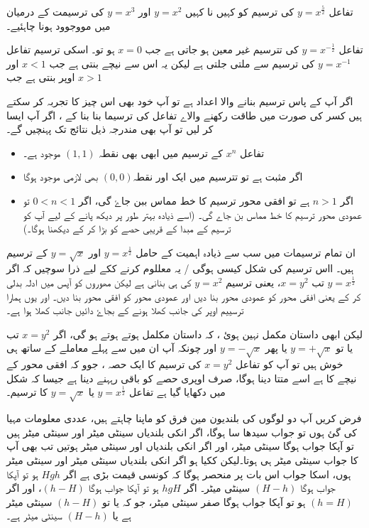 تفاعل \(y=x^{\frac{5}{2}}\) کی ترسیم کو کہیں نا کہیں  \(y=x^{2}   \) اور  \(  y=x^{3}\) کی ترسیمت کے درمیان میں مووجوود ہونا چاہئیے۔

تفاعل  \( y=x^{-\frac{1}{2}}   \) کی تترسیم غیر معین ہو جاتی ہے جب \(   x=0\) ہو تو۔ اسکی ترسیم تفاعل \(y=x^{-1}  \) کی ترسیم سے ملتی جلتی ہے لیکن یہ اس سے نیچے بنتی ہے جب  \( x<1  \) اور اوپر بنتی ہے جب \(     x>1\)

اگر آپ کے پاس ترسیم بنانے والا اعداد ہے تو آپ خود بھی اس چیز کا تجربہ کر سکتے ہیں کسر کی صورت میں طاقت رکھنے والاے تفاعل کی ترسیما بنا بنا کے ، اگر آپ ایسا کر لیں تو آپ بھی مندرجہ ذیل نتائج تک پہنچیں گے۔
\begin{itemize}
\item  
تفاعل  \( x^{n}  \) کے ترسیم میں ابھی بھی نقطہ \(   (1,1)\) موجود ہے۔ 
\item  
اگر  مثبت ہے تو تترسیم میں ایک اور نقطہ\((0,0)\) بھی لازمی موجود ہوگا 
\item 
 اگر \(n>1   \) ہے تو افقی محور ترسیم کا خط مماس ببن جاۓ گی، اگر \(   0<n<1\) تو  عمودی محور ترسیم کا خط مماس بن جاے گی۔ (اسے ذیادہ بہتر طور پر دیکھ پانے کے لیے آپ کو ترسیم کے مبدا کے قریبی حصے کو بڑا کر کے دیکھنا ہوگا۔)
\end{itemize}
  
ان تمام ترسیمات میں سب سے ذیادہ اہمیت کے حامل \(y=x^{\frac{1}{2}}  \)  اور \(   y=\sqrt{x}\) کے ترسیم ہیں۔ ااس ترسیم کی شکل کیسی ہوگی / یہ معللوم کرنے ککے لیے ذرا سوچیں کہ اگر \( y=x^{\frac{1}{2}}  \) تب \( x=y^{2}  \)، یعنی ترسیم \(   y=x^{2}\) کی ہی بنانی ہے لیکن مھوروں کو آپس میں ادلہ بدلی کر کے یعنی افقی محور کو عمودی محور بنا دیں اور عمودی محور کو افقی محور بنا دیں۔ اور یوں ہمارا ترسییم اوپر کی جانب کھلا ہونے کے بجاۓ دائیں جانب کھلا ہوا ہے۔ 

لیکن ابھی داستان مکمل نہین ہوئ ، کہ داستان مکلمل ہوتے ہوتے ہو گی، اگر \( x=y^{2}  \) تب یا تو \(  y=+\sqrt{x}  \) یا پھر \(  y=-\sqrt{x}  \) اور چونکہ آپ ان میں سے پہلے معاملے کے ساتھ ہی خوش ہیں تو آپ کو تفاعل \( x=y^{2}  \) کی ترسیم کا ایک حصہ ، جوو کہ افقی محور کے نیچے کا ہے اسے متتا  دینا ہوگا، صرف اوپری حصے کو باقی رہہنے دینا ہے جیسا کہ شکل  میں دکھایا گیا ہے تفاعل \( y=x^{\frac{1}{2}}   \) یا \(      y=\sqrt{x} \) کا ترسیم۔
 

 فرض کریں آپ دو لوگوں کی بلندیون مین فرق کو ماپنا چاہتے ہیں، عددی معلومات مہیا کی گئ ہوں تو جواب سیدھا سا ہوگا، اگر انکی بلندیاں  سینٹی میٹر اور  سینٹی میٹر ہیں تو آپکا جواب ہوگا  سینٹی میٹر، اور اگر انکی بلندیاں  اور  سینٹی میٹر ہوتیں تب بھی آپ کا جواب  سینٹی میٹر ہی ہوتا۔لیکن ککیا ہو اگر انکی بلندیاں  سینٹی میٹر اور  سینٹی میٹر ہوں، اسکا جواب اس بات پر منحصر ہوگا کہ کونسی قیمت بڑی ہے اگر \( Hg h \) ہو تو آپکا جواب ہوگا \((H-h)  \) سینٹی میٹر۔  اگر \( hg H \) ہو تو آپکا جواب ہوگا \((h-H)  \)،  اور اگر\((h=H)  \) ہو تو آپکا جواب ہوگا صفر سینٹی میٹر، جو کہ یا تو \((h-H)  \) سینٹی میٹر ہے یا  \((H-h)  \) سینٹی میٹر ہے۔


